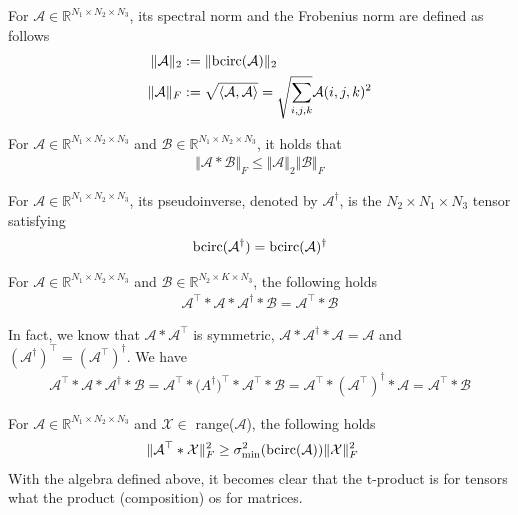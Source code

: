 \documentclass[aspectratio=169]{beamer}
\def\r{\right}
\def\bcirc{{\rm bcirc}}
\def\fm#1{\mathcal{#1}}
\def\r{\mathbb{R}}
\def\fm#1{\mathcal{#1}}
\def\r{\mathbb{R}}
\begin{document}
\begin{frame}{}
\begin{definition}  For $\fm A \in \r^{N_1 \times N_2 \times N_3}$, its spectral norm and the Frobenius norm are defined as follows
\begin{align}
    \Vert \fm A \Vert_2 &  := \Vert \bcirc (\fm A ) \Vert_2\\
    \Vert \fm A \Vert_F &:= \sqrt{\langle \fm A , \fm A \rangle} = \sqrt{\sum_{i,j,k}}\fm A(i,j,k)^2
\end{align}
\end{definition} 
\begin{lemma}
    For $\fm A\in \r^{N_1\times N_2 \times N_3}$ and $\fm B\in \r^{N_1\times N_2 \times N_3}$, it holds that 
    \begin{align}
        \Vert \fm A * \fm B \Vert_F\leq \Vert \fm A \Vert_2 \Vert \fm B \Vert_F
    \end{align}
\end{lemma}
\end{frame}
\begin{frame}{}
\begin{definition} For $\fm A\in \r^{N_1\times N_2\times N_3}$, its pseudoinverse, denoted by $\fm A^\dagger$, is the $N_2\times N_1\times N_3$ tensor satisfying
\begin{align}
    \bcirc(\fm A^\dagger) = \bcirc(\fm A )^\dagger
\end{align}
\end{definition}
\begin{lemma} For $\fm A\in \r^{N_1\times N_2\times N_3}$ and  $\fm B\in \r^{N_2\times K\times N_3}$, the following holds
\begin{align}
\fm A^\top * \fm A * \fm A^\dagger* \fm B = \fm A^\top * \fm B
\end{align}
\end{lemma}
In fact, we know that  $\fm A * \fm A^\top $ is symmetric, $\fm A * \fm A^\dagger * \fm A = \fm A$ and $(\fm A^\dagger)^\top = (\fm A^\top)^\dagger $. We have
\begin{align*}
    \fm A^\top * \fm A * \fm A^\dagger * \fm B  = \fm A^\top *\fm (A^\dagger)^\top * \fm A^\top  * \fm B = \fm A^\top * (\fm A^\top)^\dagger * \fm A = \fm A^\top * \fm B
\end{align*}
\end{frame}
\begin{frame}{}
\begin{lemma}
For $\fm A\in \r^{N_1\times N_2\times N_3}$ and $\fm X\in $ range($\fm A$),  the following holds 
\begin{align}
    \Vert \fm A^\top * \fm X \Vert_F^2 &  \geq \sigma_{\min}^2(\bcirc(\fm A))\Vert \fm X \Vert_F^2
\end{align}
With the algebra defined above, it becomes clear that the t-product is for tensors what the product (composition) os for matrices.
\end{lemma}
\end{frame}
\end{document}
